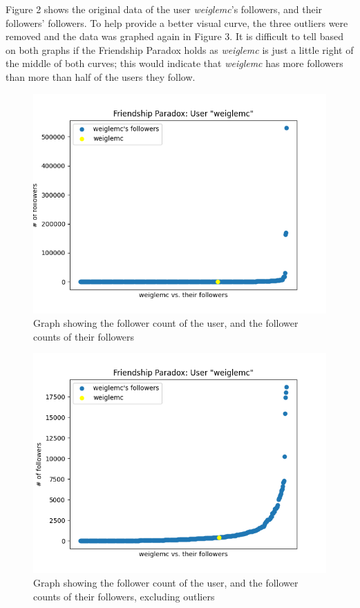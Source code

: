 \documentclass[12pt]{article}
\begin{document}
Figure 2 shows the original data of the user \emph{weiglemc}'s followers, and their followers' followers. To help provide a better visual curve, the three outliers were removed and the data was graphed again in Figure 3. It is difficult to tell based on both graphs if the Friendship Paradox holds as \emph{weiglemc} is just a little right of the middle of both curves; this would indicate that \emph{weiglemc} has more followers than more than half of the users they follow.

\begin{figure}
    \centering
    \includegraphics{FollowerCounts.png}
    \caption{Graph showing the follower count of the user, and the follower counts of their followers}
    \label{fig:my_label}
\end{figure}


\begin{figure}
    \centering
    \includegraphics{FollowerCountsTrimmed.png}
    \caption{Graph showing the follower count of the user, and the follower counts of their followers, excluding outliers}
    \label{fig:my_label}
\end{figure}
\end{document}
